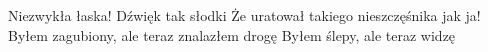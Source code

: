 Niezwykła łaska!
Dźwięk tak słodki
Że uratował takiego nieszczęśnika jak ja!
Byłem zagubiony, ale teraz znalazłem drogę
Byłem ślepy, ale teraz widzę 
